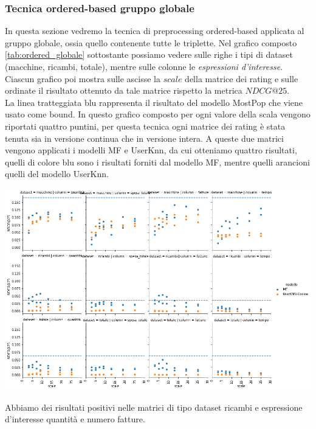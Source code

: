 \subsubsection{Tecnica ordered-based gruppo globale}
In questa sezione vedremo la tecnica di preprocessing ordered-based applicata al gruppo globale, ossia quello contenente tutte le triplette.
Nel grafico composto \ref{tab:ordered_globale} sottostante possiamo vedere sulle righe i tipi di dataset (macchine, ricambi, totale), mentre sulle colonne le \textit{espressioni d'interesse}. Ciascun grafico poi mostra sulle ascisse la $scale$ della matrice dei rating e sulle ordinate il risultato ottenuto da tale matrice rispetto la metrica $NDCG@25$. \\
La linea tratteggiata blu rappresenta il risultato del modello MostPop che viene usato come bound.
In questo grafico composto per ogni valore della scala vengono riportati quattro puntini, per questa tecnica ogni matrice dei rating è stata tenuta sia in versione continua che in versione intera. A queste due matrici vengono applicati i modelli MF e UserKnn, da cui otteniamo quattro risultati, quelli di colore blu sono i risultati forniti dal modello MF, mentre quelli arancioni quelli del modello UserKnn.

\begin{center}
    \includegraphics[width=16cm]{figures/risultati_ordered_globale.png}
    \label{tab:ordered_globale}
\end{center}

Abbiamo dei risultati positivi nelle matrici di tipo dataset ricambi e espressione d'interesse quantità e numero fatture.\\

